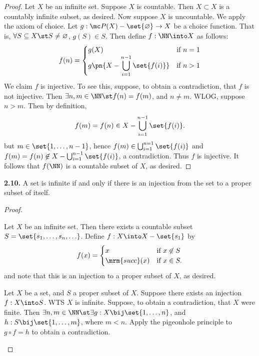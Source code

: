 \documentclass{fkbook}
\newenvironment{problem}[1][Problem \thesection.]
{\begin{boxedminipage}{\linewidth}\textbf{#1.}}
{\end{boxedminipage}}
\begin{document}
\begin{proof}
  Let $X$ be an infinite set. Suppose $X$ is countable. Then $X \subset X$ is a
  countably infinite subset, as desired. Now suppose $X$ is uncountable. We
  apply the axiom of choice. Let $g : \mc P(X) - \set{\varnothing} \to X$ be a
  choice function. That is, $\forall S \subseteq X \st S \neq \varnothing$,
  $g(S) \in S$. Then define $f : \NN \into X$ as follows:
  \[
    f(n) =
    \begin{cases}
      g(X) & \text{if } n = 1 \\
      \displaystyle g\pn{X - \bigcup_{i=1}^{n-1} \set{f(i)}} & \text{if } n > 1
    \end{cases}
  \]
  We claim $f$ is injective. To see this, suppose, to obtain a contradiction,
  that $f$ is not injective. Then $\exists n,m \in \NN \st f(n) = f(m)$, and $n
  \neq m$. WLOG, suppose $n > m$. Then by definition,
  \[
    f(m) = f(n) \in X - \bigcup_{i=1}^{n-1} \set{f(i)}.
  \]
  but $m \in \set{1, \ldots, n-1}$, hence $f(m) \in \bigcup_{i=1}^{n=1}
  \set{f(i)}$ and $f(m) = f(n) \not \in X - \bigcup_{i=1}^{n-1} \set{f(i)}$, a
  contradiction. Thus $f$ is injective. It follows that $f(\NN)$ is a countable
  subset of $X$, as desired.
\end{proof}
\begin{problem}[2.10]
  A set is infinite if and only if there is an injection from the set to a
  proper subset of itself.
\end{problem}
\begin{proof}~
  \begin{iffproof}
    \item Let $X$ be an infinite set. Then there exists a countable subset $S =
      \set{s_1, \ldots, s_n, \ldots}$. Define $f : X \into X - \set{s_1}$ by
      \[
        f(x) =
        \begin{cases}
          x & \text{if } x \not \in S \\
          \mrm{succ}(x) & \text{if } x \in S.
        \end{cases}
      \]
      and note that this is an injection to a proper subset of $X$, as desired.
    \item Let $X$ be a set, and $S$ a proper subset of $X$. Suppose there exists
      an injection $f : X \into S$. WTS $X$ is infinite. Suppose, to obtain a
      contradiction, that $X$ were finite. Then $\exists n,m \in \NN \st \exists
      g : X \bij \set{1, \ldots, n}$, and $h : S \bij \set{1, \ldots, m}$, where
      $m < n$. Apply the pigeonhole principle to $g \circ f = h$ to obtain a
      contradiction.
  \end{iffproof}
\end{proof}
\end{document}
